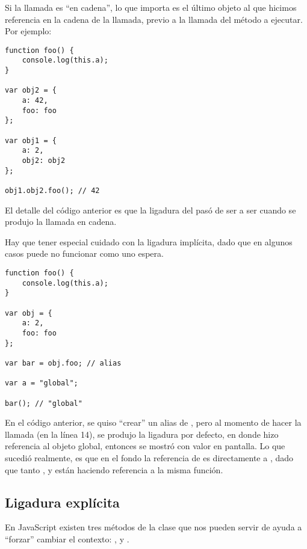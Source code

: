 Si la llamada es "`en cadena"', lo que importa es el último objeto al que hicimos referencia en la cadena de la llamada, previo a la llamada del método a ejecutar. Por ejemplo:

\begin{lstlisting}
function foo() {
	console.log(this.a);
}

var obj2 = {
	a: 42,
	foo: foo
};

var obj1 = {
	a: 2,
	obj2: obj2
};

obj1.obj2.foo(); // 42
\end{lstlisting}

El detalle del código anterior es que la ligadura del  pasó de ser  a ser  cuando se produjo la llamada en cadena.

Hay que tener especial cuidado con la ligadura implícita, dado que en algunos casos puede no funcionar como uno espera.

\begin{lstlisting}
function foo() {
	console.log(this.a);
}

var obj = {
	a: 2,
	foo: foo
};

var bar = obj.foo; // alias

var a = "global";

bar(); // "global"
\end{lstlisting}

En el código anterior, se quiso "`crear"'  un alias de , pero al momento de hacer la llamada (en la línea 14), se produjo la ligadura por defecto, en donde  hizo referencia al objeto global, entonces se mostró  con valor  en pantalla. Lo que sucedió realmente, es que en el fondo la referencia de  es directamente a , dado que tanto ,  y  están haciendo referencia a la misma función.

\subsection{Ligadura explícita}
\label{subsec:ligaduraexplicita}

En JavaScript existen tres métodos de la clase  que nos pueden servir de ayuda a "`forzar"' cambiar el contexto: ,  y .

